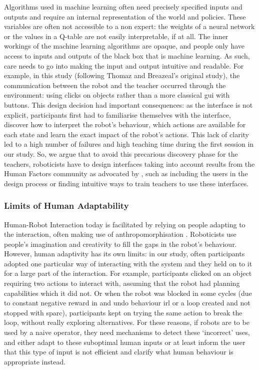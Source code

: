 Algorithms used in machine learning often need precisely specified inputs and outputs and require an internal representation of the world and policies. These variables are often not accessible to a non expert: the weights of a neural network or the values in a Q-table are not easily interpretable, if at all. The inner workings of the machine learning algorithms are opaque, and people only have access to inputs and outputs of the black box that is machine learning. As such, care needs to go into making the input and output intuitive and readable. For example, in this study (following Thomaz and Breazeal's original study), the communication between the robot and the teacher occurred through the environment: using clicks on objects rather than a more classical \gls{gui} with buttons. This design decision had important consequences: as the interface is not explicit, participants first had to familiarise themselves with the interface, discover how to interpret the robot's behaviour, which actions are available for each state and learn the exact impact of the robot's actions. This lack of clarity led to a high number of failures and high teaching time during the first session in our study. So, we argue that to avoid this precarious discovery phase for the teachers, roboticists have to design interfaces taking into account results from the Human Factors community as advocated by \cite{adams2002critical}, such as including the users in the design process or finding intuitive ways to train teachers to use these interfaces.

\subsubsection{Limits of Human Adaptability}

Human-Robot Interaction today is facilitated by relying on people adapting to the interaction, often making use of anthropomorphisation \citep{zlotowski2015anthropomorphism}. Roboticists use people's imagination and creativity to fill the gaps in the robot's behaviour. However, human adaptivity has its own limits: in our study, often participants adopted one particular way of interacting with the system and they held on to it for a large part of the interaction. For example, participants clicked on an object requiring two actions to interact with, assuming that the robot had planning capabilities which it did not. Or when the robot was blocked in some cycles (due to constant negative reward in and undo behaviour \gls{irl} or a loop created and not stopped with \gls{sparc}), participants kept on trying the same action to break the loop, without really exploring alternatives. For these reasons, if robots are to be used by a naive operator, they need mechanisms to detect these `incorrect' uses, and either adapt to these suboptimal human inputs or at least inform the user that this type of input is not efficient and clarify what human behaviour is appropriate instead.

